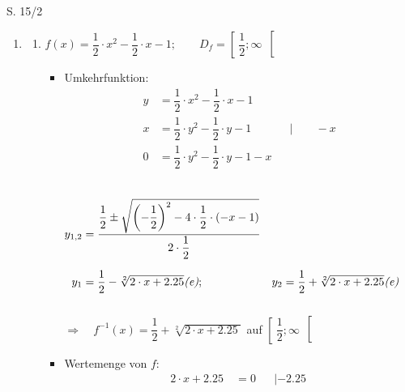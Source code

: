 \begin{Exercise}{S. 15/2}{}
    \begin{enumerate}
        \item [2.]\begin{enumerate}[label=\alph*)]
            \item[b)] {
                $f(x) = \dfrac{1}{2} \cdot x^2 - \dfrac{1}{2} \cdot x - 1; \qquad D_{f} = \left[ \ \dfrac{1}{2}; \infty \ \right[$\\
                \begin{itemize}[leftmargin=*]
                    \item Umkehrfunktion: \\{
                        \vspace{-2.0ex}
                        \begin{align*}
                            y &= \dfrac{1}{2} \cdot x^2 - \dfrac{1}{2} \cdot x - 1 && \\[1.5ex]
                            x & = \dfrac{1}{2} \cdot y^2 - \dfrac{1}{2} \cdot y - 1 &&| \qquad -x\\[2.0ex]
                            0 &= \dfrac{1}{2} \cdot y^2 - \dfrac{1}{2} \cdot y - 1 - x && \\[1.5ex]
                        \end{align*}\\
                        \begin{align*}
                            y_{1, 2} &= \dfrac{\dfrac{1}{2} \pm \sqrt{\left(-\dfrac{1}{2}\right)^2 - 4 \cdot \dfrac{1}{2} \cdot (-x - 1)}}{2 \cdot \dfrac{1}{2}}\\[1.5ex]
                            y_{1} &= \dfrac{1}{2} - \sqrt[2]{2 \cdot x + \SI{2.25}{}} \text{\textit{(e)}}; & y_{2} &= \dfrac{1}{2} + \sqrt[2]{2 \cdot x + \SI{2.25}{}} \text{\textit{(e)}}&&
                        \end{align*}\\
                        $\Rightarrow \quad f^{-1}(x) = \dfrac{1}{2} + \sqrt[2]{2 \cdot x +
                        \SI{2.25}{}}$ \quad auf \quad $\left[ \ \dfrac{1}{2}; \infty \ \right[$\\
                        }
                    \item Wertemenge von $f$: \\{
                        \vspace{-1.0ex}
                        \begin{align*}
                            2 \cdot x + \SI{2.25}{} &= 0 &&| -\SI{2.25}{}\\[1.0ex]

\end{align*}}
\end{itemize}}
\end{enumerate}
\end{enumerate}
\end{Exercise}
